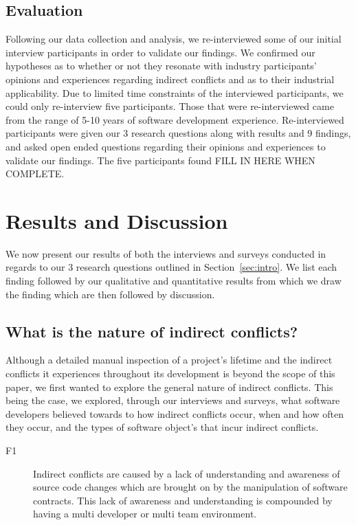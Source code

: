 \documentclass[conference]{IEEEtran}
\makeatletter
\def\namedlabel#1#2{\begingroup
   \def\@currentlabel{#2}%
   \label{#1}\endgroup
}
\makeatother
\begin{document}
\subsection{Evaluation}

Following our data collection and analysis, we re-interviewed some of our initial interview participants
in order to validate our findings. We confirmed our hypotheses as to whether or not they resonate with 
industry participants' opinions and experiences regarding indirect conflicts and as to their industrial 
applicability. Due to limited time constraints of the interviewed participants, we could only re-interview
five participants. Those that were re-interviewed came from the range of 5-10 years of software development
experience. Re-interviewed participants were given our 3 research questions along with results and 9 findings,
and asked open ended questions regarding their opinions and experiences to validate our findings. The five
participants found FILL IN HERE WHEN COMPLETE.

\section{Results and Discussion}
\label{sec:results}

We now present our results of both the interviews and surveys conducted in regards to our 3 research questions
outlined in Section~\ref{sec:intro}. We list each finding followed by our qualitative and quantitative results
from which we draw the finding which are then followed by discussion.

\subsection{What is the nature of indirect conflicts?}

Although a detailed manual inspection of a project's lifetime and the indirect conflicts it experiences throughout
its development is beyond the scope of this paper, we first wanted to explore the general nature of indirect 
conflicts. This being the case, we explored, through our interviews and surveys, what software developers believed
towards to how indirect conflicts occur, when and how often they occur, and the types of 
software object's that incur indirect conflicts.

\begin{description}
	\item[F1\namedlabel{itm:f1}{F1}] Indirect conflicts are caused by a lack of understanding and awareness of source code changes which are brought on
						by the manipulation of software contracts. This lack of awareness and understanding is compounded by having a multi developer
						or multi team environment.
\end{description}
\end{document}
